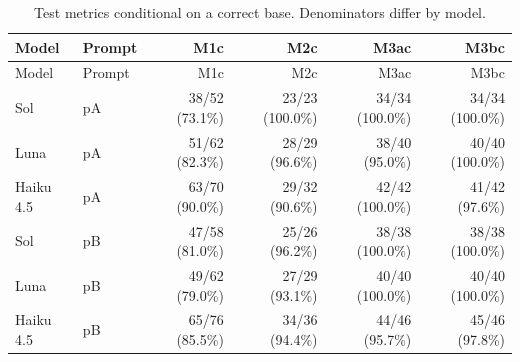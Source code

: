 \documentclass[11pt,a4paper]{article}
\begin{document}
\begingroup\small\setlength{\tabcolsep}{4pt}
\begin{longtable}{llrrrr}
\caption{Test metrics conditional on a correct base. Denominators differ by model.}\\
\toprule
Model & Prompt & M1c & M2c & M3ac & M3bc \\
\midrule\endfirsthead
\toprule
Model & Prompt & M1c & M2c & M3ac & M3bc \\
\midrule\endhead
\bottomrule\endfoot
Sol & pA & 38/52 (73.1\%) & 23/23 (100.0\%) & 34/34 (100.0\%) & 34/34 (100.0\%) \\
Luna & pA & 51/62 (82.3\%) & 28/29 (96.6\%) & 38/40 (95.0\%) & 40/40 (100.0\%) \\
Haiku 4.5 & pA & 63/70 (90.0\%) & 29/32 (90.6\%) & 42/42 (100.0\%) & 41/42 (97.6\%) \\
Sol & pB & 47/58 (81.0\%) & 25/26 (96.2\%) & 38/38 (100.0\%) & 38/38 (100.0\%) \\
Luna & pB & 49/62 (79.0\%) & 27/29 (93.1\%) & 40/40 (100.0\%) & 40/40 (100.0\%) \\
Haiku 4.5 & pB & 65/76 (85.5\%) & 34/36 (94.4\%) & 44/46 (95.7\%) & 45/46 (97.8\%) \\
\end{longtable}\endgroup
\end{document}
